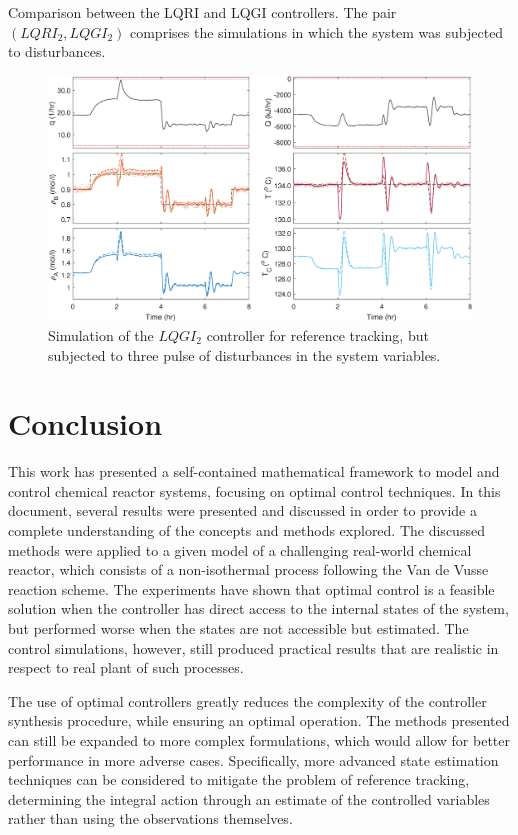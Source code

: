 \documentclass[a4paper,11pt]{book}
\numberwithin{figure}{chapter}
\numberwithin{equation}{chapter}
\numberwithin{table}{chapter}
\theoremstyle{definition}
\begin{document}
\begin{table}[ht]
	\caption{Comparison between the LQRI and LQGI controllers. The pair $(LQRI_2, LQGI_2)$ comprises the simulations in which the system was subjected to disturbances.}
	\label{tb:lqriMetrics}
\end{table}

\begin{figure}[ht] \centering
	\includegraphics[width=\textwidth]{chapter7/lqgi02}
	\caption{Simulation of the $LQGI_2$ controller for reference tracking, but subjected to three pulse of disturbances in the system variables.}
	\label{fig:lqgi02}
\end{figure}	

\clearpage
\chapter{Conclusion}

This work has presented a self-contained mathematical framework to model and control chemical reactor systems, focusing on optimal control techniques. In this document, several results were presented and discussed in order to provide a complete understanding of the concepts and methods explored. The discussed methods were applied to a given model of a challenging real-world chemical reactor, which consists of a non-isothermal process following the Van de Vusse reaction scheme. The experiments have shown that optimal control is a feasible solution when the controller has direct access to the internal states of the system, but performed worse when the states are not accessible but estimated. The control simulations, however, still produced practical results that are realistic in respect to real plant of such processes.

The use of optimal controllers greatly reduces the complexity of the controller synthesis procedure, while ensuring an optimal operation. The methods presented can still be expanded to more complex formulations, which would allow for better performance in more adverse cases. Specifically, more advanced state estimation techniques can be considered to mitigate the problem of reference tracking, determining the integral action through an estimate of the controlled variables rather than using the observations themselves.
\end{document}
